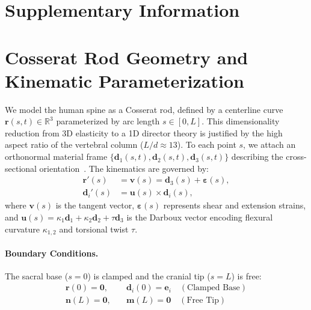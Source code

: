 \newpage
\appendix
\section*{Supplementary Information}

\setcounter{section}{0}
\renewcommand{\thesection}{S\arabic{section}}
\renewcommand{\theequation}{S\arabic{equation}}
\setcounter{equation}{0}
\renewcommand{\thefigure}{S\arabic{figure}}
\setcounter{figure}{0}
\renewcommand{\thetable}{S\arabic{table}}
\setcounter{table}{0}

\section{Cosserat Rod Geometry and Kinematic Parameterization}

We model the human spine as a Cosserat rod, defined by a centerline curve $\mathbf{r}(s,t) \in \mathbb{R}^3$ parameterized by arc length $s \in [0, L]$. This dimensionality reduction from 3D elasticity to a 1D director theory is justified by the high aspect ratio of the vertebral column ($L/d \approx 13$). To each point $s$, we attach an orthonormal material frame $\{\mathbf{d}_1(s,t), \mathbf{d}_2(s,t), \mathbf{d}_3(s,t)\}$ describing the cross-sectional orientation~\cite{goriely2017mathematics, gazzola2018forward}. The kinematics are governed by:
\begin{align}
\mathbf{r}'(s) &= \mathbf{v}(s) = \mathbf{d}_3(s) + \boldsymbol{\varepsilon}(s), \\
\mathbf{d}_i'(s) &= \mathbf{u}(s) \times \mathbf{d}_i(s),
\end{align}
where $\mathbf{v}(s)$ is the tangent vector, $\boldsymbol{\varepsilon}(s)$ represents shear and extension strains, and $\mathbf{u}(s) = \kappa_1 \mathbf{d}_1 + \kappa_2 \mathbf{d}_2 + \tau \mathbf{d}_3$ is the Darboux vector encoding flexural curvature $\kappa_{1,2}$ and torsional twist $\tau$.

\paragraph{Boundary Conditions.} The sacral base ($s=0$) is clamped and the cranial tip ($s=L$) is free:
\begin{align}
\mathbf{r}(0) = \mathbf{0}, \quad &\mathbf{d}_i(0) = \mathbf{e}_i \quad (\text{Clamped Base}) \nonumber \\
\mathbf{n}(L) = \mathbf{0}, \quad &\mathbf{m}(L) = \mathbf{0} \quad (\text{Free Tip})
\end{align}

